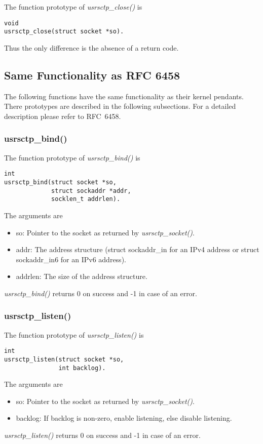 \documentclass[a4paper]{article}
\begin{document}
The function prototype of \textit{usrsctp\_close()} is 
\begin{verbatim}   
void
usrsctp_close(struct socket *so).
 \end{verbatim}
Thus the only difference is the absence of a return code. 
 
\subsection{Same Functionality as RFC 6458}
The following functions have the same functionality as their kernel pendants. There prototypes
are described in the following subsections. For a detailed description please refer to RFC~6458.

\subsubsection{usrsctp\_bind()}
The function prototype of \textit{usrsctp\_bind()} is 
\begin{verbatim}
int
usrsctp_bind(struct socket *so,
             struct sockaddr *addr,
             socklen_t addrlen).
\end{verbatim}     
The arguments are
\begin{itemize}
\item so: Pointer to the socket as returned by \textit{usrsctp\_socket()}.
\item addr: The address structure (struct sockaddr\_in for an IPv4 address
      or struct sockaddr\_in6 for an IPv6 address).
\item addrlen: The size of the address structure.
\end{itemize}
\textit{usrsctp\_bind()} returns 0 on success and -1 in case of an error.

\subsubsection{usrsctp\_listen()}
The function prototype of \textit{usrsctp\_listen()} is 
\begin{verbatim}
int
usrsctp_listen(struct socket *so,
               int backlog).
 \end{verbatim}      
The arguments are
\begin{itemize}
\item so: Pointer to the socket as returned by \textit{usrsctp\_socket()}.
\item backlog: If backlog is non-zero, enable listening, else disable
      listening.
\end{itemize}
\textit{usrsctp\_listen()} returns 0 on success and -1 in case of an error.
\end{document}

